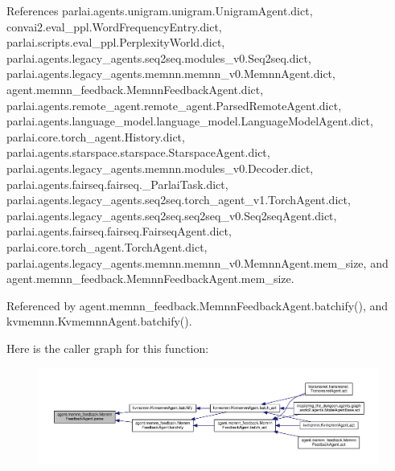 References parlai.\+agents.\+unigram.\+unigram.\+Unigram\+Agent.\+dict, convai2.\+eval\+\_\+ppl.\+Word\+Frequency\+Entry.\+dict, parlai.\+scripts.\+eval\+\_\+ppl.\+Perplexity\+World.\+dict, parlai.\+agents.\+legacy\+\_\+agents.\+seq2seq.\+modules\+\_\+v0.\+Seq2seq.\+dict, parlai.\+agents.\+legacy\+\_\+agents.\+memnn.\+memnn\+\_\+v0.\+Memnn\+Agent.\+dict, agent.\+memnn\+\_\+feedback.\+Memnn\+Feedback\+Agent.\+dict, parlai.\+agents.\+remote\+\_\+agent.\+remote\+\_\+agent.\+Parsed\+Remote\+Agent.\+dict, parlai.\+agents.\+language\+\_\+model.\+language\+\_\+model.\+Language\+Model\+Agent.\+dict, parlai.\+core.\+torch\+\_\+agent.\+History.\+dict, parlai.\+agents.\+starspace.\+starspace.\+Starspace\+Agent.\+dict, parlai.\+agents.\+legacy\+\_\+agents.\+memnn.\+modules\+\_\+v0.\+Decoder.\+dict, parlai.\+agents.\+fairseq.\+fairseq.\+\_\+\+Parlai\+Task.\+dict, parlai.\+agents.\+legacy\+\_\+agents.\+seq2seq.\+torch\+\_\+agent\+\_\+v1.\+Torch\+Agent.\+dict, parlai.\+agents.\+legacy\+\_\+agents.\+seq2seq.\+seq2seq\+\_\+v0.\+Seq2seq\+Agent.\+dict, parlai.\+agents.\+fairseq.\+fairseq.\+Fairseq\+Agent.\+dict, parlai.\+core.\+torch\+\_\+agent.\+Torch\+Agent.\+dict, parlai.\+agents.\+legacy\+\_\+agents.\+memnn.\+memnn\+\_\+v0.\+Memnn\+Agent.\+mem\+\_\+size, and agent.\+memnn\+\_\+feedback.\+Memnn\+Feedback\+Agent.\+mem\+\_\+size.



Referenced by agent.\+memnn\+\_\+feedback.\+Memnn\+Feedback\+Agent.\+batchify(), and kvmemnn.\+Kvmemnn\+Agent.\+batchify().

Here is the caller graph for this function\+:
\nopagebreak
\begin{figure}[H]
\begin{center}
\leavevmode
\includegraphics[width=350pt]{classagent_1_1memnn__feedback_1_1MemnnFeedbackAgent_a4decbb76deb6205e546de7e4ae09a774_icgraph}
\end{center}
\end{figure}
\mbox{\label{classagent_1_1memnn__feedback_1_1MemnnFeedbackAgent_a4012774ea6fbe10c6315f1c010d63f09}} 
